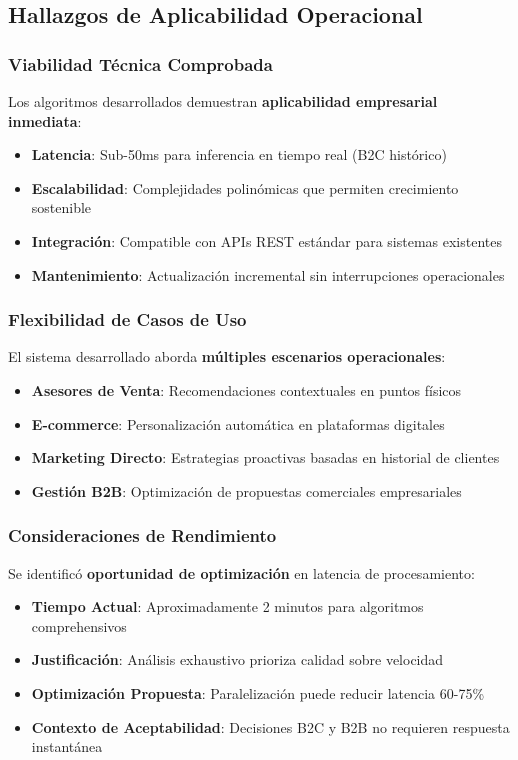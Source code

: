\documentclass[twocolumn]{article}
\begin{document}
\subsection{Hallazgos de Aplicabilidad Operacional}

\subsubsection{Viabilidad Técnica Comprobada}

Los algoritmos desarrollados demuestran \textbf{aplicabilidad empresarial inmediata}:
\begin{itemize}
    \item \textbf{Latencia}: Sub-50ms para inferencia en tiempo real (B2C histórico)
    \item \textbf{Escalabilidad}: Complejidades polinómicas que permiten crecimiento sostenible
    \item \textbf{Integración}: Compatible con APIs REST estándar para sistemas existentes
    \item \textbf{Mantenimiento}: Actualización incremental sin interrupciones operacionales
\end{itemize}

\subsubsection{Flexibilidad de Casos de Uso}

El sistema desarrollado aborda \textbf{múltiples escenarios operacionales}:
\begin{itemize}
    \item \textbf{Asesores de Venta}: Recomendaciones contextuales en puntos físicos
    \item \textbf{E-commerce}: Personalización automática en plataformas digitales
    \item \textbf{Marketing Directo}: Estrategias proactivas basadas en historial de clientes
    \item \textbf{Gestión B2B}: Optimización de propuestas comerciales empresariales
\end{itemize}

\subsubsection{Consideraciones de Rendimiento}

Se identificó \textbf{oportunidad de optimización} en latencia de procesamiento:
\begin{itemize}
    \item \textbf{Tiempo Actual}: Aproximadamente 2 minutos para algoritmos comprehensivos
    \item \textbf{Justificación}: Análisis exhaustivo prioriza calidad sobre velocidad
    \item \textbf{Optimización Propuesta}: Paralelización puede reducir latencia 60-75\%
    \item \textbf{Contexto de Aceptabilidad}: Decisiones B2C y B2B no requieren respuesta instantánea
\end{itemize}
\end{document}
